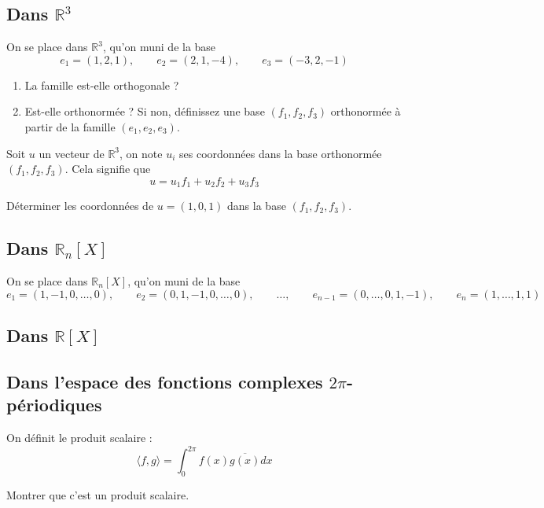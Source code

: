 \subsection{Dans $\mathbb{R}^3$}

On se place dans $\mathbb{R}^3$, qu'on muni de la base 
$$e_1 = (1,2,1), \qquad e_2 = (2,1,-4), \qquad e_3 = (-3,2,-1)$$

\begin{enumerate}
\item La famille est-elle orthogonale ? 
\item Est-elle orthonormée ? Si non, définissez une base $(f_1,f_2,f_3)$ orthonormée à partir de la famille $(e_1,e_2,e_3)$. 
\end{enumerate}

Soit $u$ un vecteur de $\mathbb{R}^3$, on note $u_i$ ses coordonnées dans la base orthonormée $(f_1,f_2,f_3)$. Cela signifie que 
$$u = u_1 f_1 + u_2 f_2 + u_3 f_3$$

Déterminer les coordonnées de $u = (1,0,1)$ dans la base $(f_1,f_2,f_3)$.

\vspace{2em}

\subsection{Dans $\mathbb{R}_n[X]$}

On se place dans $\mathbb{R}_n[X]$, qu'on muni de la base 
$$e_1 = (1, -1, 0, \dots, 0), \qquad e_2 = (0, 1, -1, 0, \dots, 0), \qquad \dots, \qquad e_{n-1} = (0, \dots, 0, 1, -1), \qquad e_n = (1, \dots, 1, 1)$$
\subsection{Dans $\mathbb{R}[X]$}



\subsection{Dans l'espace des fonctions complexes $2\pi$-périodiques}

On définit le produit scalaire :
$$
\langle f, g \rangle = \int_{0}^{2\pi} f(x) \overline{g(x)} dx
$$

Montrer que c'est un produit scalaire.